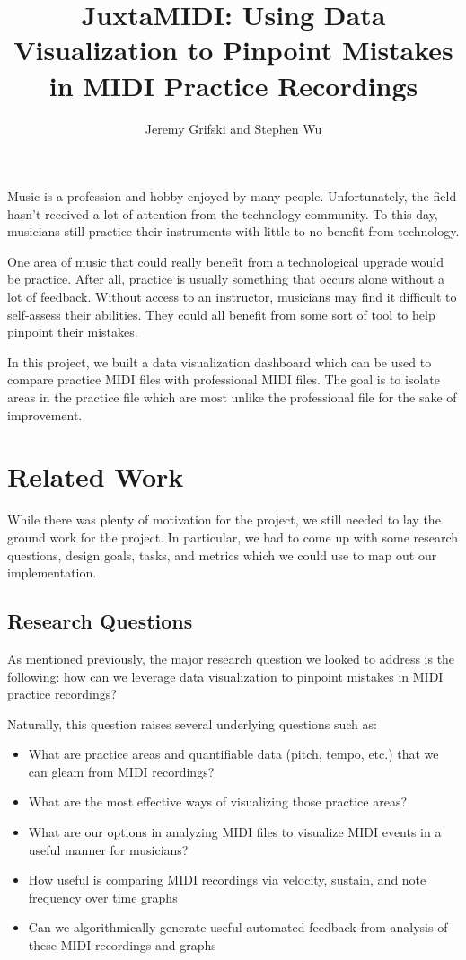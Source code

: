 \documentclass[journal]{vgtc}                %
\title{JuxtaMIDI: Using Data Visualization to Pinpoint Mistakes in MIDI Practice Recordings}
\author{Jeremy Grifski and Stephen Wu}
\begin{document}

\maketitle

Music is a profession and hobby enjoyed by many people. Unfortunately, the
field hasn't received a lot of attention from the technology community. To
this day, musicians still practice their instruments with little to no
benefit from technology.

One area of music that could really benefit from a technological upgrade would
be practice. After all, practice is usually something that occurs alone without
a lot of feedback. Without access to an instructor, musicians may find it difficult
to self-assess their abilities. They could all benefit from some sort of tool
to help pinpoint their mistakes.

In this project, we built a data visualization dashboard which can be used to
compare practice MIDI files with professional MIDI files. The goal is to isolate
areas in the practice file which are most unlike the professional file for the
sake of improvement.

\section{Related Work}

While there was plenty of motivation for the project, we still needed to
lay the ground work for the project. In particular, we had to come up with some
research questions, design goals, tasks, and metrics which we could use to map
out our implementation.

\subsection{Research Questions}

As mentioned previously, the major research question we looked to address is the
following: how can we leverage data visualization to pinpoint mistakes in MIDI
practice recordings?

Naturally, this question raises several underlying questions such as:

\begin{itemize}
  \item What are practice areas and quantifiable data (pitch, tempo, etc.) that
  we can gleam from MIDI recordings?
  \item What are the most effective ways of visualizing those practice areas?
  \item What are our options in analyzing MIDI files to visualize MIDI events
  in a useful manner for musicians?
  \item How useful is comparing MIDI recordings via velocity, sustain, and note
  frequency over time graphs
  \item Can we algorithmically generate useful automated feedback from analysis
  of these MIDI recordings and graphs
\end{itemize}
\end{document}
